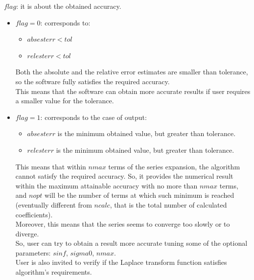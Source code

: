 \documentclass[10pt]{article}
\begin{document}
\begin{description}

\item $flag$: it is about the obtained accuracy.

\begin{itemize}
\item[] $flag =0$: corresponds to:
\begin{itemize}
\item $absesterr < tol$
\item $relesterr < tol$
\end{itemize}

Both the absolute and the relative error estimates are smaller than tolerance, so the software fully satisfies the required accuracy. \\
This means that the software can obtain more accurate results if user requires a smaller value for the tolerance.

 \item[] $flag =1$: corresponds to the case of output:
\begin{itemize}
\item
$absesterr$ is the minimum obtained value, but greater than tolerance.
\item $relesterr$ is the minimum obtained value, but greater than tolerance.
\end{itemize}
This means that within $nmax$ terms of the series expansion, the algorithm cannot satisfy the required accuracy. So, it provides the numerical result within the maximum attainable accuracy with no more than $nmax$ terms, and $nopt$ will be the  number of terms  at which such minimum is reached (eventually different from $ncalc$, that is the total number of calculated coefficients). \\
Moreover, this means that the series seems to converge too slowly or to diverge.\\
So, user can try to obtain a  result more accurate tuning some of the optional parameters: $sinf$, $sigma0$, $nmax$.\\
User is also invited  to verify if the Laplace transform function satisfies algorithm's requirements.


\end{itemize}
\end{description}
\end{document}

